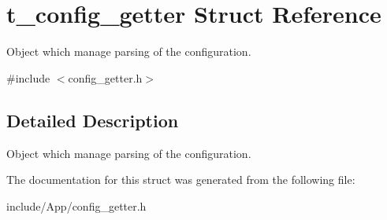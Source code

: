 \section{t\+\_\+config\+\_\+getter Struct Reference}
\label{structt__config__getter}


Object which manage parsing of the configuration.  




{\ttfamily \#include $<$config\+\_\+getter.\+h$>$}



\subsection{Detailed Description}
Object which manage parsing of the configuration. 

The documentation for this struct was generated from the following file\+:\begin{DoxyCompactItemize}
\item 
include/\+App/config\+\_\+getter.\+h\end{DoxyCompactItemize}
